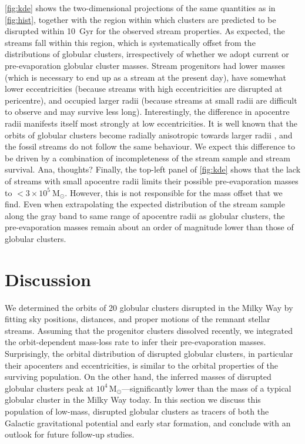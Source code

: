 \documentclass[twocolumn]{aastex63}
\newcommand{\msun}{\ensuremath{\textrm{M}_\odot}}
\begin{document}
\autoref{fig:kde} shows the two-dimensional projections of the same quantities as in \autoref{fig:hist}, together with the region within which clusters are predicted to be disrupted within 10~Gyr for the observed stream properties. As expected, the streams fall within this region, which is systematically offset from the distributions of globular clusters, irrespectively of whether we adopt current or pre-evaporation globular cluster masses. Stream progenitors had lower masses (which is necessary to end up as a stream at the present day), have somewhat lower eccentricities (because streams with high eccentricities are disrupted at pericentre), and occupied larger radii (because streams at small radii are difficult to observe and may survive less long). Interestingly, the difference in apocentre radii manifests itself most strongly at low eccentricities. It is well known that the orbits of globular clusters become radially anisotropic towards larger radii \citep[e.g.][]{dinescu99}, and the fossil streams do not follow the same behaviour. We expect this difference to be driven by a combination of incompleteness of the stream sample and stream survival. {\color{red}Ana, thoughts?} Finally, the top-left panel of \autoref{fig:kde} shows that the lack of streams with small apocentre radii limits their possible pre-evaporation masses to $<3\times10^5~\msun$. However, this is not responsible for the mass offset that we find. Even when extrapolating the expected distribution of the stream sample along the gray band to same range of apocentre radii as globular clusters, the pre-evaporation masses remain about an order of magnitude lower than those of globular clusters.


\section{Discussion}
\label{sec:discussion}

We determined the orbits of 20 globular clusters disrupted in the Milky Way by fitting sky positions, distances, and proper motions of the remnant stellar streams.
Assuming that the progenitor clusters dissolved recently, we integrated the orbit-dependent mass-loss rate to infer their pre-evaporation masses.
Surprisingly, the orbital distribution of disrupted globular clusters, in particular their apocenters and eccentricities, is similar to the orbital properties of the surviving population.
On the other hand, the inferred masses of disrupted globular clusters peak at $10^4\,\msun$---significantly lower than the mass of a typical globular cluster in the Milky Way today.
In this section we discuss this population of low-mass, disrupted globular clusters as tracers of both the Galactic gravitational potential and early star formation, and conclude with an outlook for future follow-up studies.
\end{document}
